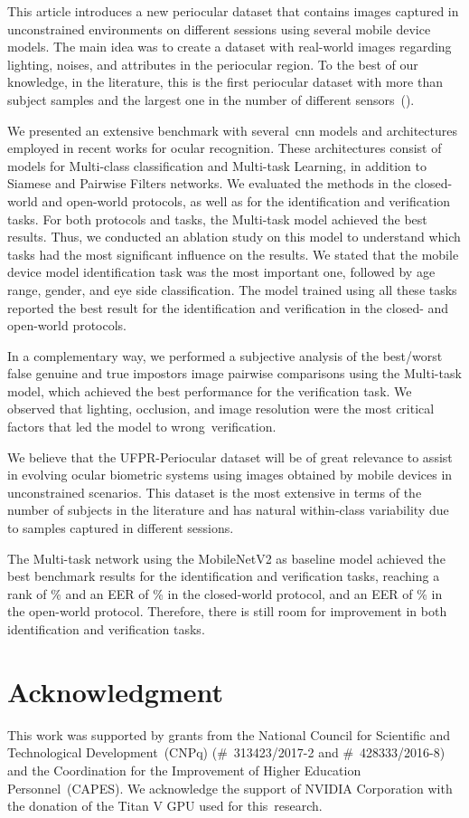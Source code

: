 \documentclass[journal]{IEEEtran}
\begin{document}
This article introduces a new periocular dataset that contains images captured in unconstrained environments on different sessions using several mobile device models.
The main idea was to create a dataset with real-world images regarding lighting, noises, and attributes in the periocular region.
To the best of our knowledge, in the literature, this is the first periocular dataset with more than  subject samples and the largest one in the number of different sensors~().

We presented an extensive benchmark with several~\gls{cnn} models and architectures employed in recent works for ocular recognition.
These architectures consist of models for Multi-class classification and Multi-task Learning, in addition to Siamese and Pairwise Filters networks.
We evaluated the methods in the closed-world and open-world protocols, as well as for the identification and verification tasks.
For both protocols and tasks, the Multi-task model achieved the best results.
Thus, we conducted an ablation study on this model to understand which tasks had the most significant influence on the results.
We stated that the mobile device model identification task was the most important one, followed by age range, gender, and eye side classification.
The model trained using all these tasks reported the best result for the identification and verification in the closed- and open-world protocols. 

In a complementary way, we performed a subjective analysis of the best/worst false genuine and true impostors image pairwise comparisons using the Multi-task model, which achieved the best performance for the verification task. 
We observed that lighting, occlusion, and image resolution were the most critical factors that led the model to wrong~verification.

We believe that the UFPR-Periocular dataset will be of great relevance to assist in evolving ocular biometric systems using images obtained by mobile devices in unconstrained scenarios.  
This dataset is the most extensive in terms of the number of subjects in the literature and has natural within-class variability due to samples captured in different sessions.

The Multi-task network using the MobileNetV2 as baseline model achieved the best benchmark results for the identification and verification tasks, reaching a rank  of \% and an EER of \% in the closed-world protocol, and an EER of \% in the open-world protocol.
Therefore, there is still room for improvement in both identification and verification tasks.
 

\section*{Acknowledgment}
This work was supported by grants from the National Council for Scientific and Technological Development~(CNPq) (\#~313423/2017-2 and \#~428333/2016-8) and the Coordination for the Improvement of Higher Education Personnel~(CAPES).
We acknowledge the support of NVIDIA Corporation with the donation of the Titan V GPU used for this~research.
\ifCLASSOPTIONcaptionsoff
  \newpage
\fi




\end{document}
